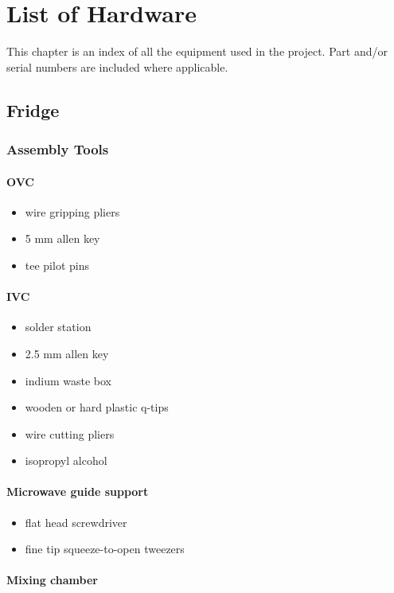 \chapter{List of Hardware}
\label{hardware}
This chapter is an index of all the equipment used in the project.  Part and/or serial numbers are included where applicable.
 
\section{Fridge}
  \subsection{Assembly Tools}
\subsubsection{OVC}

\begin{itemize}
  \item wire gripping pliers
  \item 5 mm allen key
  \item tee pilot pins  
\end{itemize}

\subsubsection{IVC}
\begin{itemize}
  \item solder station
  \item 2.5 mm allen key
  \item indium waste box
  \item wooden or hard plastic q-tips
  \item wire cutting pliers
  \item isopropyl alcohol 
\end{itemize}

\subsubsection{Microwave guide support}

\begin{itemize}
  \item flat head screwdriver
  \item fine tip squeeze-to-open tweezers 
\end{itemize}
 
\subsubsection{Mixing chamber}

